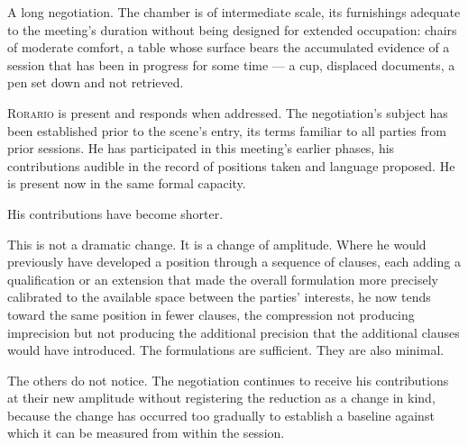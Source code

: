 \documentclass[12pt, oneside]{article}
\newenvironment{action}{%
  \vspace{0.6em}%
  \noindent\ignorespaces%
}{%
  \par\vspace{0.6em}%
}
\begin{document}
\begin{action}
A long negotiation. The chamber is of intermediate scale, its furnishings adequate to the meeting's duration without being designed for extended occupation: chairs of moderate comfort, a table whose surface bears the accumulated evidence of a session that has been in progress for some time --- a cup, displaced documents, a pen set down and not retrieved.

\textsc{Rorario} is present and responds when addressed. The negotiation's subject has been established prior to the scene's entry, its terms familiar to all parties from prior sessions. He has participated in this meeting's earlier phases, his contributions audible in the record of positions taken and language proposed. He is present now in the same formal capacity.

His contributions have become shorter.

This is not a dramatic change. It is a change of amplitude. Where he would previously have developed a position through a sequence of clauses, each adding a qualification or an extension that made the overall formulation more precisely calibrated to the available space between the parties' interests, he now tends toward the same position in fewer clauses, the compression not producing imprecision but not producing the additional precision that the additional clauses would have introduced. The formulations are sufficient. They are also minimal.

The others do not notice. The negotiation continues to receive his contributions at their new amplitude without registering the reduction as a change in kind, because the change has occurred too gradually to establish a baseline against which it can be measured from within the session.
\end{action}
\end{document}
